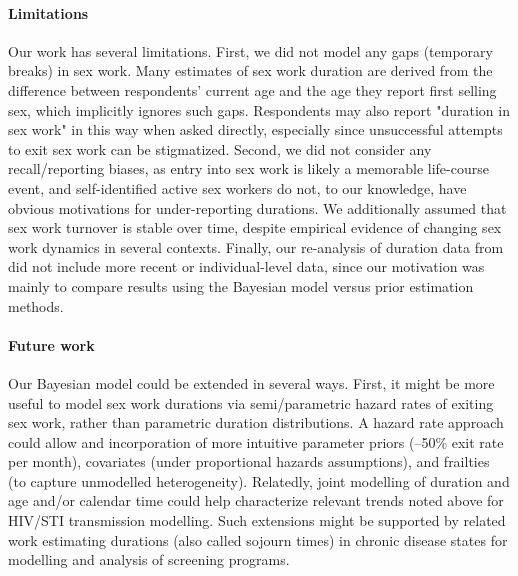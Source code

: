 \paragraph{Limitations}
Our work has several limitations.
First, we did not model any gaps (temporary breaks) in sex work.
Many estimates of sex work duration are derived from
the difference between respondents' current age and the age they report first selling sex,
which implicitly ignores such gaps.
Respondents may also report "duration in sex work" in this way when asked directly,
especially since unsuccessful attempts to exit sex work can be stigmatized.\cite{Lora2025}
Second, we did not consider any recall/reporting biases,
as entry into sex work is likely a memorable life-course event,
\cite{Sandy2025,Cimino2017,Ingabire2012,Bowen2011,Lora2025}
and self-identified active sex workers do not, to our knowledge, have
obvious motivations for under-reporting durations.
We additionally assumed that sex work turnover is stable over time,
despite empirical evidence of changing sex work dynamics in several contexts.
\cite{Anderegg2024,Anderson2026}
Finally, our re-analysis of duration data from \citep{Fazito2012}
did not include more recent or individual-level data,
since our motivation was mainly to compare
results using the Bayesian model versus prior estimation methods.
\paragraph{Future work}
Our Bayesian model could be extended in several ways.
First, it might be more useful to model sex work durations
via semi/parametric hazard rates of exiting sex work,
rather than parametric duration distributions.
A hazard rate approach could allow and incorporation of
more intuitive parameter priors (--50\% exit rate per month),
covariates (\eg under proportional hazards assumptions),\cite{Kalbfleisch2023} and
frailties (\eg to capture unmodelled heterogeneity).\cite{Balan2020}
Relatedly, joint modelling of duration and age and/or calendar time
could help characterize relevant trends noted above
\eg for HIV/STI transmission modelling.\cite{Anderegg2024,Anderson2026}
Such extensions might be supported by related work estimating
durations (also called sojourn times) in chronic disease states
for modelling and analysis of screening programs.\cite{Zelen1969}
